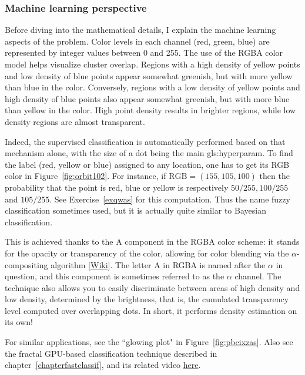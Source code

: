 \documentclass[oneside,10pt]{book}
\begin{document}
\subsubsection{Machine learning perspective}\label{rmlp}

Before diving into the mathematical details, I explain the machine learning aspects of the problem. Color levels in each channel (red, green, blue)  are represented by  integer values between 0 and 255. The use of the \textcolor{index}{RGBA} color model helps visualize cluster overlap. Regions with a high density of yellow points and low density of blue points appear somewhat greenish, but with more yellow than blue in the color. Conversely, regions with a low density of yellow points and high density of blue points also appear somewhat greenish, but with more blue than yellow in the color. High point density results in
brighter regions, while low density regions are almost transparent.

Indeed, the supervised classification is automatically performed based on that mechanism alone,
with the size of a dot being the main \gls{gls:hyperparam}. To find the label (red, yellow or blue) assigned to any location, one has to get its RGB color in Figure~\ref{fig:orbit102}.
For instance, if $\text{RGB} = (155, 105, 100)$ then the probability that the point is red, blue or yellow is respectively
$50/255, 100/255$ and $105/255$. See Exercise~\ref{exqwas} for this computation. Thus the name fuzzy classification sometimes used, but it is actually quite similar to Bayesian classification.

This is achieved thanks to the A component in the RGBA color scheme: it stands for the opacity or transparency of the color, allowing for color blending via the \textcolor{index}{$\alpha$-compositing} algorithm [\href{https://en.wikipedia.org/wiki/Alpha_compositing}{Wiki}]. The letter A in RGBA is named after the $\alpha$ in question, and this component is sometimes referred to as the $\alpha$ channel. The technique also allows you to easily discriminate between areas of high density and low density, determined by the brightness, that is, the cumulated transparency level computed over overlapping dots. In short, it performs density estimation on its own!

For similar applications, see the ``glowing plot" in  Figure~\ref{fig:pbcixzas}. Also see the fractal GPU-based classification technique
described in chapter~\ref{chapterfastclassif}, and its related video \href{https://mltechniques.com/2022/03/31/very-deep-neural-networks-explained-in-40-seconds/}{here}.
\end{document}
